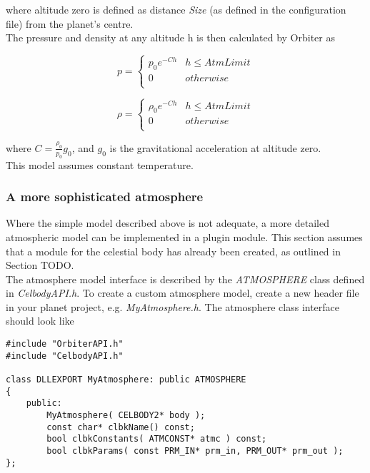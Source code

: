 \documentclass[Orbiter Developer Manual.tex]{subfiles}
\begin{document}
\noindent
where altitude zero is defined as distance \textit{Size} (as defined in the configuration file) from the planet’s centre.\\
The pressure and density at any altitude h is then calculated by Orbiter as

\[ p =
\left\{
\begin{array}{ll}
	p_{0}e^{-Ch} & h \leq AtmLimit \\
	0 & otherwise \\
\end{array} 
\right. \]

\[ \rho =
\left\{
\begin{array}{ll}
	\rho_{0}e^{-Ch} & h \leq AtmLimit \\
	0 & otherwise \\
\end{array} 
\right. \]

\noindent
where $C = \frac{\rho_{0}}{p_{0}}g_{0}$, and $g_{0}$ is the gravitational acceleration at altitude zero.\\
This model assumes constant temperature.


\subsubsection{A more sophisticated atmosphere}
Where the simple model described above is not adequate, a more detailed atmospheric model can be implemented in a plugin module. This section assumes that a module for the celestial body has already been created, as outlined in Section TODO.\\
The atmosphere model interface is described by the \textit{ATMOSPHERE} class defined in \textit{CelbodyAPI.h}. To create a custom atmosphere model, create a new header file in your planet project, e.g. \textit{MyAtmosphere.h}. The atmosphere class interface should look like

\begin{lstlisting}
#include "OrbiterAPI.h"
#include "CelbodyAPI.h"

class DLLEXPORT MyAtmosphere: public ATMOSPHERE
{
	public:
		MyAtmosphere( CELBODY2* body );
		const char* clbkName() const;
		bool clbkConstants( ATMCONST* atmc ) const;
		bool clbkParams( const PRM_IN* prm_in, PRM_OUT* prm_out );
};
\end{lstlisting}
\end{document}
